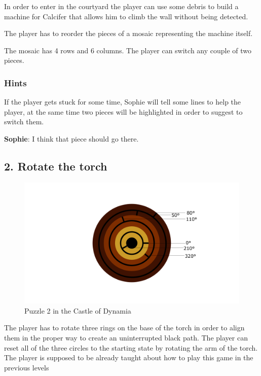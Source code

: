 In order to enter in the courtyard the player can use some debris to build a machine for Calcifer that allows him to climb the wall without being detected.


The player has to reorder the pieces of a mosaic representing the machine itself.

The mosaic has 4 rows and 6 columns. The player can switch any couple of two pieces.

\subsubsection*{Hints}
If the player gets stuck for some time, Sophie will tell some lines to help the player, at the same time two pieces will be highlighted in order to suggest to switch them.

\textbf{Sophie}: I think that piece should go there.

\subsection{2. Rotate the torch}

\begin{figure}[H]
  \centering
  \includegraphics[width=\textwidth]{Images/Puzzles/torchPuzzleStart}
  \caption{Puzzle 2 in the Castle of Dynamia}
\end{figure}

The player has to rotate three rings on the base of the torch in order to align them in the proper way to create an uninterrupted black path. The player can reset all of the three circles to the starting state by rotating the arm of the torch. The player is supposed to be already taught about how to play this game in the previous levels

